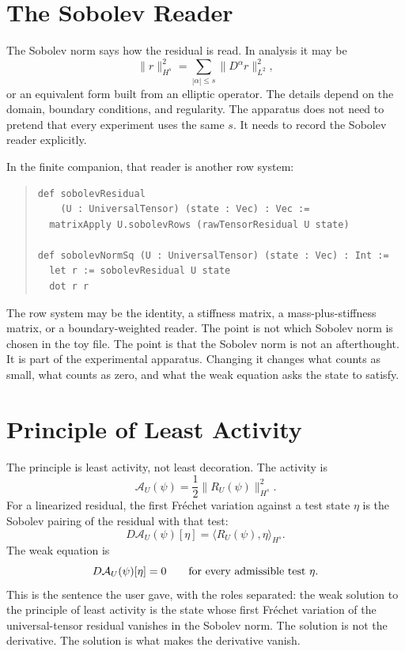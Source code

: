 \section{The Sobolev Reader}

The Sobolev norm says how the residual is read. In analysis it may be
\[
  \|r\|_{H^s}^{2}
  =
  \sum_{|\alpha|\le s}\|D^\alpha r\|_{L^2}^{2},
\]
or an equivalent form built from an elliptic operator. The details depend on the domain, boundary conditions,
and regularity. The apparatus does not need to pretend that every experiment uses the same \(s\). It needs to
record the Sobolev reader explicitly.

In the finite companion, that reader is another row system:

\begin{quote}\small
\begin{verbatim}
def sobolevResidual
    (U : UniversalTensor) (state : Vec) : Vec :=
  matrixApply U.sobolevRows (rawTensorResidual U state)

def sobolevNormSq (U : UniversalTensor) (state : Vec) : Int :=
  let r := sobolevResidual U state
  dot r r
\end{verbatim}
\end{quote}

The row system may be the identity, a stiffness matrix, a mass-plus-stiffness matrix, or a boundary-weighted
reader. The point is not which Sobolev norm is chosen in the toy file. The point is that the Sobolev norm is not
an afterthought. It is part of the experimental apparatus. Changing it changes what counts as small, what counts
as zero, and what the weak equation asks the state to satisfy.

\section{Principle of Least Activity}

The principle is least activity, not least decoration. The activity is
\[
  \mathcal A_U(\psi) =
  \frac12\|R_U(\psi)\|_{H^s}^{2}.
\]
For a linearized residual, the first Fréchet variation against a test state \(\eta\) is the Sobolev pairing of
the residual with that test:
\[
  D\mathcal A_U(\psi)[\eta]
  =
  \langle R_U(\psi), \eta\rangle_{H^s}.
\]
The weak equation is
\[
  D\mathcal A_U(\psi)[\eta] = 0
  \qquad
  \hbox{for every admissible test }\eta .
\]
This is the sentence the user gave, with the roles separated: the weak solution to the principle of least
activity is the state whose first Fréchet variation of the universal-tensor residual vanishes in the Sobolev
norm. The solution is not the derivative. The solution is what makes the derivative vanish.

